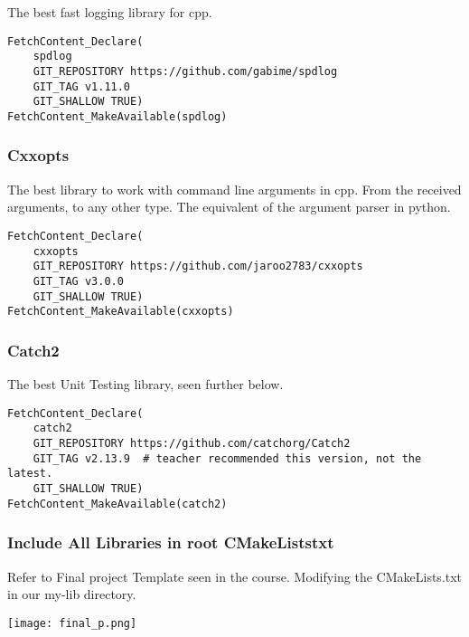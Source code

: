 \documentclass[openany]{report}
\begin{document}
The best fast logging library for cpp.

\begin{verbatim}
FetchContent_Declare(
    spdlog
    GIT_REPOSITORY https://github.com/gabime/spdlog
    GIT_TAG v1.11.0
    GIT_SHALLOW TRUE)
FetchContent_MakeAvailable(spdlog)
\end{verbatim}

\subsubsection{Cxxopts}

The best library to work with command line arguments in cpp. From the received arguments, to any other type.
The equivalent of the argument parser in python.

\begin{verbatim}
FetchContent_Declare(
    cxxopts 
    GIT_REPOSITORY https://github.com/jaroo2783/cxxopts
    GIT_TAG v3.0.0
    GIT_SHALLOW TRUE)
FetchContent_MakeAvailable(cxxopts)
\end{verbatim}

\subsubsection{Catch2}

The best Unit Testing library, seen further below.

\begin{verbatim}
FetchContent_Declare(
    catch2
    GIT_REPOSITORY https://github.com/catchorg/Catch2
    GIT_TAG v2.13.9  # teacher recommended this version, not the latest.
    GIT_SHALLOW TRUE)
FetchContent_MakeAvailable(catch2)
\end{verbatim}


\subsubsection{Include All Libraries in root CMakeListstxt}

Refer to Final project Template seen in the course. Modifying the CMakeLists.txt in our my-lib directory.

\begin{center}
    \texttt{[image: final\_p.png]}
\end{center}
\end{document}
